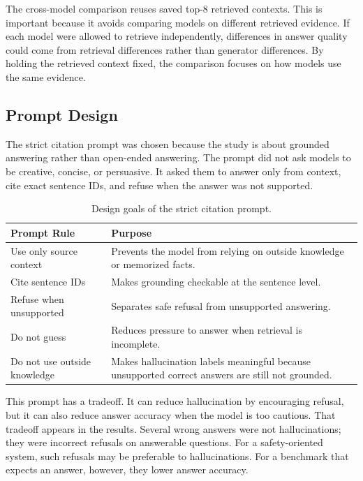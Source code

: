 \documentclass[10pt,twocolumn]{article}
\begin{document}
The cross-model comparison reuses saved top-8 retrieved contexts. This is important because it avoids comparing models on different retrieved evidence. If each model were allowed to retrieve independently, differences in answer quality could come from retrieval differences rather than generator differences. By holding the retrieved context fixed, the comparison focuses on how models use the same evidence.

\subsection{Prompt Design}

The strict citation prompt was chosen because the study is about grounded answering rather than open-ended answering. The prompt did not ask models to be creative, concise, or persuasive. It asked them to answer only from context, cite exact sentence IDs, and refuse when the answer was not supported.

\begin{table}[t]
\centering
\small
\begin{tabular}{p{}p{}}
\toprule
\textbf{Prompt Rule} & \textbf{Purpose} \\
\midrule
Use only source context & Prevents the model from relying on outside knowledge or memorized facts. \\
Cite sentence IDs & Makes grounding checkable at the sentence level. \\
Refuse when unsupported & Separates safe refusal from unsupported answering. \\
Do not guess & Reduces pressure to answer when retrieval is incomplete. \\
Do not use outside knowledge & Makes hallucination labels meaningful because unsupported correct answers are still not grounded. \\
\bottomrule
\end{tabular}
\caption{Design goals of the strict citation prompt.}
\label{tab:prompt-rules}
\end{table}

This prompt has a tradeoff. It can reduce hallucination by encouraging refusal, but it can also reduce answer accuracy when the model is too cautious. That tradeoff appears in the results. Several wrong answers were not hallucinations; they were incorrect refusals on answerable questions. For a safety-oriented system, such refusals may be preferable to hallucinations. For a benchmark that expects an answer, however, they lower answer accuracy.
\end{document}
